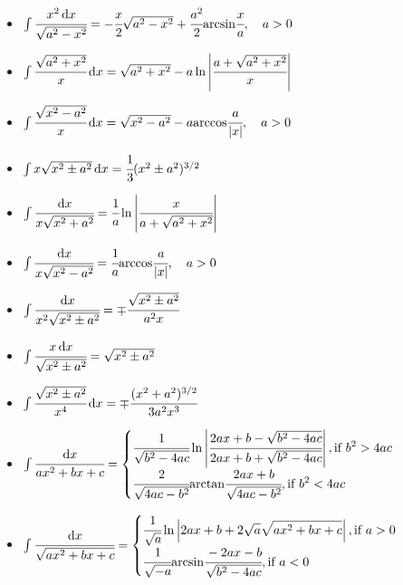 \begin{itemize}
\item $ \int \cfrac{x^2 \, { { \text{d} } x}}{\sqrt{a^2 - x^2}} = - \cfrac{x}{2} \sqrt{a^2 - x^2} + \cfrac{a^2}{2} { \mathop{\text{arcsin}} } \cfrac{x}{a}, \quad a > 0 $
\item $ \int \cfrac{\sqrt{a^2 + x^2}}{x} \, { { \text{d} } x} = \sqrt{a^2 + x^2} - a \ln\left\vert\cfrac{a + \sqrt{a^2 + x^2}}{x}\right\vert $
\item $ \int \cfrac{\sqrt{x^2 - a^2}}{x} \, { { \text{d} } x} = \sqrt{x^2 - a^2} - a { \mathop{\text{arccos}} } \cfrac{a}{\vert x\vert} ,\quad a > 0 $
\item $ \int x \sqrt{x^2 \pm a^2} \, { { \text{d} } x} = \cfrac{1}{3} (x^2 \pm a^2)^{3/2} $
\item $ \int \cfrac{{ { \text{d} } x}}{x \sqrt{x^2 + a^2}} = \cfrac{1}{a} \ln \left\vert\cfrac{x}{a + \sqrt{a^2 + x^2}}\right\vert $

\item $ \int \cfrac{{ { \text{d} } x}}{x \sqrt{x^2 - a^2}} = \cfrac{1}{a} { \mathop{\text{arccos}} } \cfrac{a}{\vert x\vert} ,\quad a > 0 $
\item $ \int \cfrac{{ { \text{d} } x}}{x^2 \sqrt{x^2 \pm a^2}} = \mp \cfrac{\sqrt{x^2 \pm a^2}}{a^2 x} $
\item $ \int \cfrac{x \, { { \text{d} } x}}{\sqrt{x^2 \pm a^2}} = \sqrt{x^2 \pm a^2} $
\item $ \int \cfrac{\sqrt{x^2 \pm a^2}}{x^4} \, { { \text{d} } x} = \mp \cfrac{(x^2 + a^2)^{3/2}}{3a^2 x^3} $
\item $ \int \cfrac{{ { \text{d} } x}}{a x^2  + bx + c} = 
  \begin{cases}
  \displaystyle \cfrac{1}{\sqrt{b^2 -4ac}} \ln \left\vert\cfrac{ 2ax + b - \sqrt{b^2 -4ac}}{2ax + b + \sqrt{b^2 -4ac}}\right\vert, \text{if $b^2 > 4ac$} \\
  \displaystyle \cfrac{2}{\sqrt{4ac - b^2}} { \mathop{\text{arctan}} } \cfrac{ 2ax + b }{\sqrt{4ac - b^2}}, \text{if $b^2 < 4ac$}
  \end{cases}
$
\item $ \int \cfrac{{ { \text{d} } x}}{\sqrt{a x^2  + bx + c}}  =
  \begin{cases}
  \displaystyle \cfrac{1}{\sqrt{a}} \ln \left\vert 2ax + b + 2\sqrt{a} \sqrt{ax^2 + bx + c}\right\vert, \text{if $a > 0$} \\
  \displaystyle \cfrac{1}{\sqrt{- a}} { \mathop{\text{arcsin}} } \cfrac{-2ax - b}{\sqrt{b^2 - 4ac}}, \text{if $a < 0$}
  \end{cases}
$


\end{itemize}
